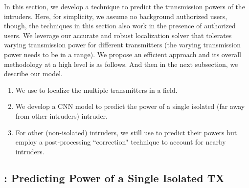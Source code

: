 In this section, we develop a technique to predict the transmission powers of the intruders. Here, for simplicity, we assume no background authorized users, though, the techniques in this section also work in the presence of authorized users. 
We leverage our accurate and robust localization solver that tolerates varying transmission power for different transmitters (the varying transmission power needs to be in a range).
We propose an efficient approach and its overall methodology at a high level is as follows.
And then in the next subsection, we describe our \power model.
\begin{enumerate}
\item We use \our to localize the multiple transmitters in a field. 
\item We develop a CNN model \power to predict the power of a single isolated (far away from other intruders) intruder. 
\item For other (non-isolated) intruders, we still use \power to predict their powers but employ a post-processing ``correction" technique to account for nearby intruders. 
\end{enumerate}


\subsection{\power: Predicting Power of a Single Isolated TX}
\label{subsec:in-out-design}

